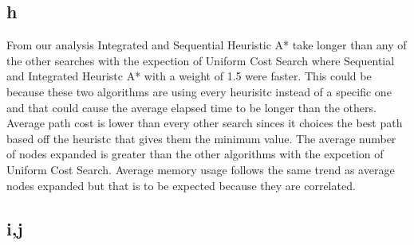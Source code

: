 \documentclass[a4paper]{article}
\begin{document}
\subsection{h}

From our analysis Integrated and Sequential Heuristic A* take longer than any of the other searches with the expection of Uniform Cost Search where Sequential and Integrated Heuristc A* with a weight of 1.5 were faster. This could be because these two algorithms are using every heurisitc instead of a specific one and that could cause the average elapsed time to be longer than the others. Average path cost is lower than every other search sinces it choices the best path based off the heuristc that gives them the minimum value. The average number of nodes expanded is greater than the other algorithms with the expcetion of Uniform Cost Search. Average memory usage follows the same trend as average nodes expanded but that is to be expected because they are correlated. 

\subsection{i,j}
\end{document}
